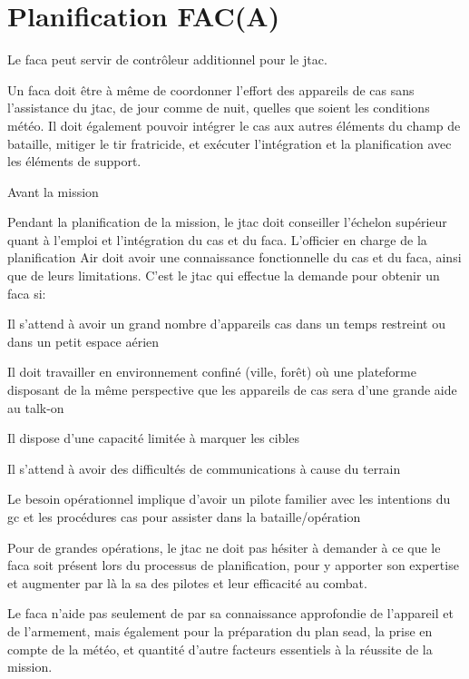 \section{Planification FAC(A)}

Le \gls{faca} peut servir de contrôleur additionnel pour le \gls{jtac}.

Un \gls{faca} doit être à même de coordonner l'effort des appareils de \gls{cas} sans l'assistance du \gls{jtac}, de jour comme de nuit, quelles que soient les conditions météo. Il doit également pouvoir intégrer le \gls{cas} aux autres éléments du champ de bataille, mitiger le tir fratricide, et exécuter l'intégration et la planification avec les éléments de support.

\begin{e1}
	\item Avant la mission
	\begin{e2}
		\item Pendant la planification de la mission, le \gls{jtac} doit conseiller l'échelon supérieur quant à l'emploi et l'intégration du \gls{cas} et du \gls{faca}. L'officier en charge de la planification Air doit avoir une connaissance fonctionnelle du \gls{cas} et du \gls{faca}, ainsi que de leurs limitations.
		C'est le \gls{jtac} qui effectue la demande pour obtenir un \gls{faca} si:
		\begin{e3}
			\item Il s'attend à avoir un grand nombre d'appareils \gls{cas} dans un temps restreint ou dans un petit espace aérien
			\item Il doit travailler en environnement confiné (ville, forêt) où une plateforme disposant de la même perspective que les appareils de \gls{cas} sera d'une grande aide au talk-on
			\item Il dispose d'une capacité limitée à marquer les cibles
			\item Il s'attend à avoir des difficultés de communications à cause du terrain
			\item Le besoin opérationnel implique d'avoir un pilote familier avec les intentions du \gls{gc} et les procédures \gls{cas} pour assister dans la bataille/opération
		\end{e3}
		\item Pour de grandes opérations, le \gls{jtac} ne doit pas hésiter à demander à ce que le \gls{faca} soit présent lors du processus de planification, pour y apporter son expertise et augmenter par là la \gls{sa} des pilotes et leur efficacité au combat.
		\item Le \gls{faca} n'aide pas seulement de par sa connaissance approfondie de l'appareil et de l'armement, mais également pour la préparation du plan \gls{sead}, la prise en compte de la météo, et quantité d'autre facteurs essentiels à la réussite de la mission.

\end{e2}
\end{e1}
